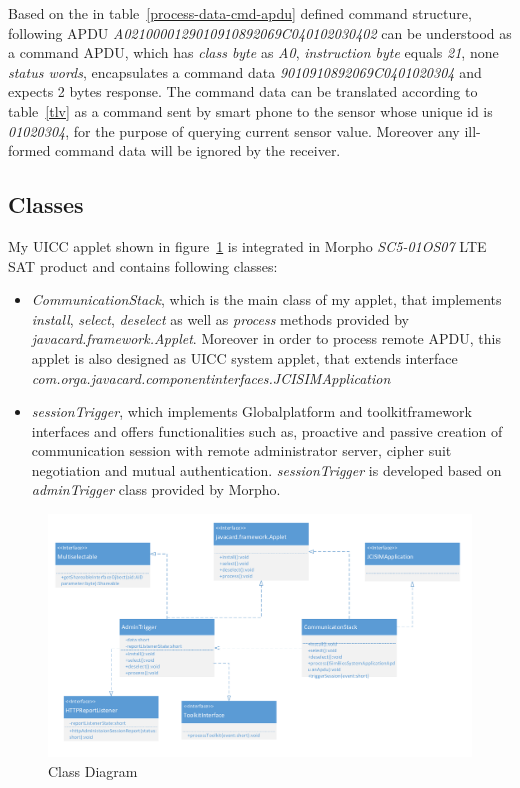 Based on the in table~\ref{process-data-cmd-apdu} defined command structure, following APDU \emph{A0210000129010910892069C040102030402}\label{remote-apdu-example} can be understood as a command APDU,  which has \emph{class byte} as \emph{A0}, \emph{instruction byte} equals \emph{21}, none \emph{status words}, encapsulates a command data \emph{9010910892069C0401020304} and expects 2 bytes response. The command data can be translated according to table~\ref{tlv} as a command sent by smart phone to the sensor whose unique id is \emph{01020304}, for the purpose of querying current sensor value. Moreover any ill-formed command data will be ignored by the receiver.

\subsection{Classes}\sloppy
My UICC applet shown in figure~\ref{fig:class} is integrated in Morpho \emph{SC5-01OS07} LTE SAT product and contains following classes:
 \begin{itemize}
  \item  \emph{CommunicationStack}, which is the main class of my applet, that implements \emph{install}, \emph{select}, \emph{deselect} as well as \emph{process} methods provided by \emph{javacard.framework.Applet}. Moreover in order to process remote APDU, this applet is also designed as UICC system applet, that extends interface \emph{com.orga.javacard.componentinterfaces.JCISIMApplication}
  \item  \emph{sessionTrigger}, which implements Globalplatform  and toolkitframework interfaces and offers functionalities such as, proactive and passive creation of communication session with remote administrator server, cipher suit negotiation and mutual authentication. \emph{sessionTrigger} is developed based on \emph{adminTrigger} class provided by Morpho.
\end{itemize}

\begin{figure}[!htbp]
	\centering
	\includegraphics[width=1.0\textwidth]{class}
		\caption{Class Diagram}
	\label{fig:class}
\end{figure}

